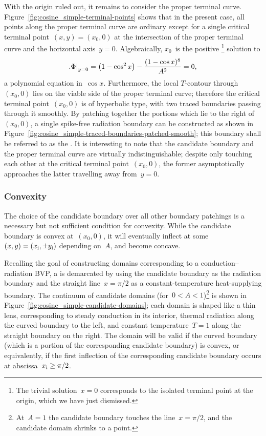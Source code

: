 With the origin ruled out,
it remains to consider the proper terminal curve.
Figure~\ref{fig:cosine_simple-terminal-points} shows that in the present case,
all points along the proper terminal curve are ordinary
except for a single critical terminal point~$(x, y) = (x_0, 0)$
at the intersection of the proper terminal curve
and the horizontal axis~$y = 0$.
Algebraically, $x_0$~is the positive%
\footnote{
  The trivial solution~$x = 0$
  corresponds to the isolated terminal point at the origin,
  which we have just dismissed.
}
solution to
\begin{equation}
  \eval[\textsize]{\Phi}_{y=0}
  = \roundbr*{1 - \cos^2 x} - \frac{(1 - \cos x)^8}{A^2}
  = 0,
  \label{eq:cosine-simple-critical-terminal-point-x}
\end{equation}
a polynomial equation in~$\cos x$.
Furthermore, the local $T$-contour through~$(x_0, 0)$
lies on the viable side of the proper terminal curve;
therefore the critical terminal point~$(x_0, 0)$ is of hyperbolic type,
with two traced boundaries passing through it smoothly.
By patching together the portions which lie to the right of~$(x_0, 0)$,
a single spike-free radiation boundary can be constructed
as shown in Figure~\ref{fig:cosine_simple-traced-boundaries-patched-smooth};
this boundary shall be referred to as the .
It is interesting to note that
the candidate boundary and the proper terminal curve
are virtually indistinguishable;
despite only touching each other at the critical terminal point~$(x_0, 0)$,
the former asymptotically approaches the latter travelling away from~$y = 0$.

\subsubsection{Convexity}
\label{sec:cartesian.cosine.simple.convexity}

The choice of the candidate boundary over all other boundary patchings
is a necessary but not sufficient condition for convexity.
While the candidate boundary is convex at~$(x_0, 0)$,
it will eventually inflect
at some~$(x, y) = (x_{\mathrm{i}}, \pm y_{\mathrm{i}})$ depending on~$A$,
and become concave.

Recalling the goal of constructing domains
corresponding to a conduction--radiation BVP\@,
a  is demarcated by using
the candidate boundary as the radiation boundary
and the straight line~$x = \pi/2$
as a constant-temperature heat-supplying boundary.
The continuum of candidate domains (for~$0 < A < 1$)\footnote{
  At~$A = 1$ the candidate boundary touches the line~$x = \pi/2$,
  and the candidate domain shrinks to a point.
}
is shown in Figure~\ref{fig:cosine_simple-candidate-domains};
each domain is shaped like a thin lens,
corresponding to steady conduction in its interior,
thermal radiation along the curved boundary to the left,
and constant temperature~$T = 1$ along the straight boundary on the right.
The domain will be valid if the curved boundary
(which is a portion of the corresponding candidate boundary)
is convex, or equivalently,
if the first inflection of the corresponding candidate boundary
occurs at abscissa~$x_{\mathrm{i}} \ge \pi/2$.

